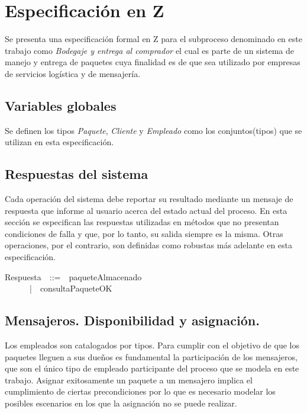 \documentclass[12pt,a4paper]{article}
\begin{document}
\newpage
\section{Especificación en Z}

Se presenta una especificación formal en Z para el subproceso denominado en este trabajo como \textit{Bodegaje y entrega al comprador} el cual es parte de un sistema de manejo y entrega de paquetes cuya finalidad es de que sea utilizado por empresas de servicios logística y de mensajería.  

\subsection{Variables globales}
Se definen los tipos \textit{Paquete}, \textit{Cliente} y \textit{Empleado}  como los conjuntos(tipos) que se utilizan en esta especificación. 

\begin{zed}
\end{zed}

\subsection{Respuestas del sistema}

Cada operación del sistema debe reportar su resultado mediante un mensaje de respuesta que informe al usuario acerca del estado actual del proceso. En esta sección se especifican las respuestas utilizadas en métodos que no presentan condiciones de falla y que, por lo tanto, su salida siempre es la misma. Otras operaciones, por el contrario, son definidas como robustas más adelante en esta especificación.

\begin{zed}
Respuesta~~::=~~paqueteAlmacenado\\
~~~~~~|~~consultaPaqueteOK\\
\end{zed}

\subsection{Mensajeros. Disponibilidad y asignación.}
\indent Los empleados son catalogados por tipos. Para cumplir con el objetivo de que los paquetes lleguen a sus dueños es fundamental la participación de los mensajeros, que son el único tipo de empleado participante del proceso que se modela en este trabajo. Asignar exitosamente un paquete a un mensajero implica el cumplimiento de ciertas precondiciones por lo que es necesario modelar los posibles escenarios en los que la asignación no se puede realizar.
\end{document}
